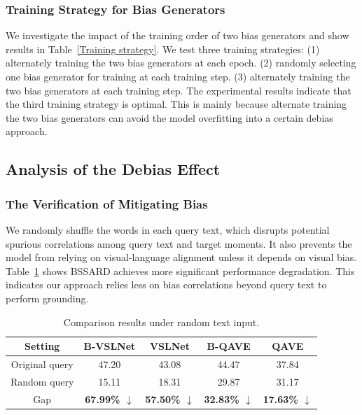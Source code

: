 \subsubsection{Training Strategy for Bias Generators}
We investigate the impact of the training order of two bias generators and show results in Table~\ref{Training strategy}.
We test three training strategies: (1) alternately training the two bias generators at each epoch. (2) randomly selecting one bias generator for training at each training step. (3) alternately training the two bias generators at each training step. 
The experimental results indicate that the third training strategy is optimal. This is mainly because alternate training the two bias generators can avoid the model overfitting into a certain debias approach.


\subsection{Analysis of the Debias Effect}


\subsubsection{The Verification of Mitigating Bias} 

We randomly shuffle the words in each query text, which disrupts potential spurious correlations among query text and target moments. It also prevents the model from relying on visual-language alignment unless it depends on visual bias. Table~\ref{ablation_removing_language_bias} shows BSSARD achieves more significant performance degradation. This indicates our approach relies less on bias correlations beyond query text to perform grounding. 


\begin{table}[t]
	\centering
	\small
	\renewcommand{\arraystretch}{1}
	\setlength{\tabcolsep}{1.2mm}
	\begin{tabular}{c c c c c }
		\toprule
		Setting & B-VSLNet & VSLNet & B-QAVE & QAVE \\
		\midrule
		Original query & 47.20 & 43.08 & 44.47 & 37.84 \\
		Random query & 15.11 & 18.31 & 29.87 & 31.17 \\
		\midrule
		Gap & \textbf{67.99\% $\downarrow$ } & \textbf{57.50\% $\downarrow$} & \textbf{32.83\% $\downarrow$} & \textbf{17.63\% $\downarrow$} \\
		\bottomrule
	\end{tabular}
	\caption{Comparison results under random text input.}
	\label{ablation_removing_language_bias}
\end{table}


